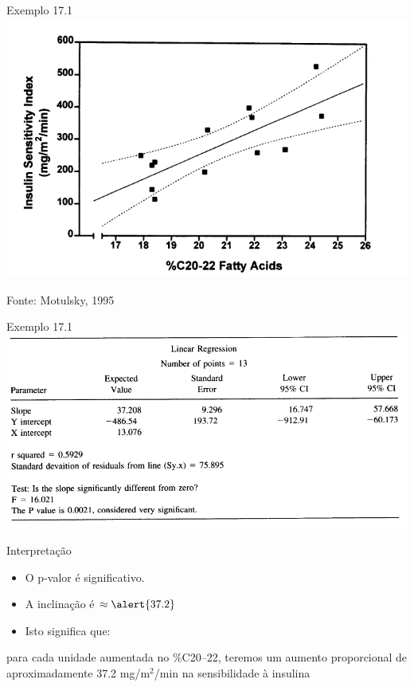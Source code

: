 \documentclass{beamer}
\begin{document}
\begin{frame}{Exemplo 17.1}
  \centering
  \includegraphics[width=.9\textwidth]{Cap18-19/regressao1}

  \vfill
  \hfill \footnotesize Fonte: Motulsky, 1995
\end{frame}

\begin{frame}{Exemplo 17.1}
  \centering
  \includegraphics[width=1.2\textwidth]{Cap18-19/regressao2}
\end{frame}

\begin{frame}{Interpretação}
  \begin{itemize}
  \item O p-valor é significativo.
  \item A inclinação é $\approx \alert{37.2}$
  \item Isto significa que:
  \end{itemize}
  \begin{block}{}
    para cada unidade aumentada no \%C20--22, teremos um aumento proporcional de aproximadamente 37.2 mg/m$^2$/min na sensibilidade à insulina
  \end{block}
\end{frame}
\end{document}
